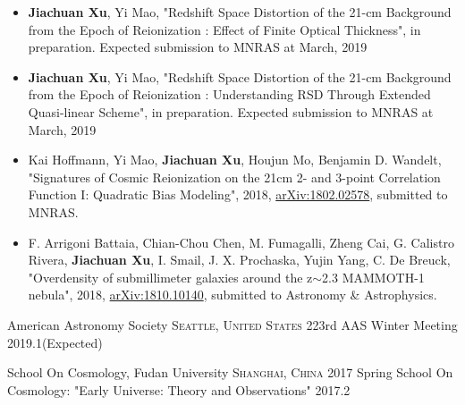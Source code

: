 \documentclass[10pt,a4paper]{article}
\newcommand{\RNum}[1]{\uppercase\expandafter{\romannumeral #1\relax}}
\begin{document}
\spacedhrule{0.4em}{0.8em}
\begin{itemize}
    \item \textbf{Jiachuan Xu}, Yi Mao, "Redshift Space Distortion of the 21-cm Background from the Epoch of Reionization \RNum{2}: Effect of Finite Optical Thickness", in preparation. Expected submission to MNRAS at March, 2019%
    \item \textbf{Jiachuan Xu}, Yi Mao, "Redshift Space Distortion of the 21-cm Background from the Epoch of Reionization \RNum{3}: Understanding RSD Through Extended Quasi-linear Scheme", in preparation. Expected submission to MNRAS at March, 2019%
\end{itemize}

\spacedhrule{0.4em}{0.8em}
\begin{itemize}
    \item Kai Hoffmann, Yi Mao, \textbf{Jiachuan Xu}, Houjun Mo, Benjamin D. Wandelt, "Signatures of Cosmic Reionization on the 21cm 2- and 3-point Correlation Function I: Quadratic Bias Modeling", 2018, \href{https://arxiv.org/abs/1802.02578}{arXiv:1802.02578}, submitted to MNRAS.
    \item F. Arrigoni Battaia, Chian-Chou Chen, M. Fumagalli, Zheng Cai, G. Calistro Rivera, \textbf{Jiachuan Xu}, I. Smail, J. X. Prochaska, Yujin Yang, C. De Breuck, "Overdensity of submillimeter galaxies around the z$\sim$2.3 MAMMOTH-1 nebula", 2018,  \href{https://arxiv.org/abs/1810.10140}{arXiv:1810.10140}, submitted to Astronomy \& Astrophysics.
\end{itemize}


\spacedhrule{0.4em}{0.8em}

\headedsection
    {American Astronomy Society}
    {\textsc{Seattle, United States}}
    {
        \headedsubsection
        {223rd AAS Winter Meeting}
        {2019.1(Expected)}
        {
        }
    }

\headedsection
  {School On Cosmology, Fudan University}
  {\textsc{Shanghai, China}}
  {
    \headedsubsection
    {2017 Spring School On Cosmology: "Early Universe: Theory and Observations"}
    {2017.2}
    {    
    }
  }
\end{document}
